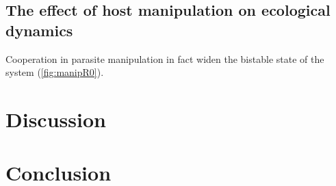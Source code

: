 \documentclass[11pt]{article}
\begin{document}
\subsection*{The effect of host manipulation on ecological dynamics}


Cooperation in parasite manipulation in fact widen the bistable state of the system (\ref{fig:manipR0}). 



\section*{Discussion}


\section*{Conclusion}
\end{document}
